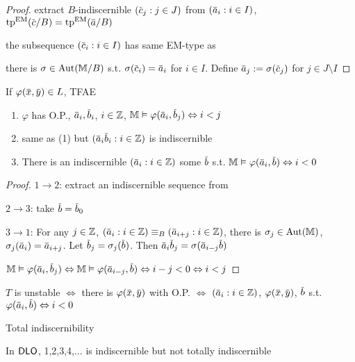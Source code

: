 \documentclass[11pt]{article}
\begin{document}
\begin{proof}
extract \(B\)-indiscernible \((\barc_j:j\in J)\)
from \((\bara_i:i\in I)\), \(\tp^{\EM}(\barc/B)=\tp^{\EM}(\bara/B)\)

the subsequence \((\barc_i:i\in I)\) has same EM-type as

there is \(\sigma\in\operatorname{\text{Aut}}(\mathbb{M}/B)\) s.t. \(\sigma(\barc_i)=\bara_i\) for \(i\in I\). Define \(\bara_j:=\sigma(\barc_j)\)
for \(j\in J\setminus I\)
\end{proof}

\begin{theorem}[]
\label{24-15}
If \(\varphi(\barx,\bary)\in L\), TFAE
\begin{enumerate}
\item \(\varphi\) has O.P., \(\bara_i,\barb_i\), \(i\in\mathbb{Z}\), \(\M\vDash\varphi(\bara_i,\barb_j)\Leftrightarrow i<j\)
\item same as (1) but \((\bara_i\barb_i:i\in\Z)\) is indiscernible
\item There is an indiscernible \((\bara_i:i\in\Z)\) some \(\barb\)
s.t. \(\M\vDash\varphi(\bara_i,\barb)\Leftrightarrow i<0\)
\end{enumerate}
\end{theorem}

\begin{proof}
\(1\to 2\): extract an indiscernible sequence from

\(2\to 3\): take \(\barb=\barb_0\)

\(3\to 1\): For any \(j\in\mathbb{Z}\), \((\bara_i:i\in\Z)\equiv_B(\bara_{i+j}:i\in\Z)\), there
is \(\sigma_j\in\operatorname{\text{Aut}}(\mathbb{M})\), \(\sigma_j(\bara_i)=\bara_{i+j}\). Let \(\barb_j=\sigma_j(\barb)\).
Then \(\bara_i\barb_j=\sigma(\bara_{i-j}\barb)\)

\(\M\vDash\varphi(\bara_i,\barb_j)\Leftrightarrow\M\vDash\varphi(\bara_{i-j},\barb)\Leftrightarrow i-j<0\Leftrightarrow i<j\)
\end{proof}

\begin{corollary}[]
\(T\) is unstable \(\Leftrightarrow\) there is \(\varphi(\barx,\bary)\) with
O.P. \(\Leftrightarrow\) \((\bara_i:i\in\Z)\), \(\varphi(\barx,\bary)\), \(\barb\)
s.t. \(\varphi(\bara_i,\barb)\Leftrightarrow i<0\)
\end{corollary}

Total indiscernibility

\begin{examplle}[]
In \(\operatorname{\textsf{DLO}}\), 1,2,3,4,\(\dots\) is indiscernible but not totally indiscernible
\end{examplle}
\end{document}
